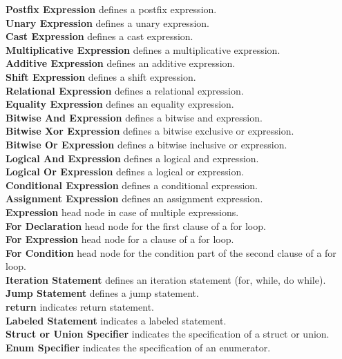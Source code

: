 \documentclass[12pt]{article}
\begin{document}
\begin{multicols}{2}
	\textbf{Postfix Expression} defines a postfix expression.\\
	\textbf{Unary Expression} defines a unary expression.\\
	\textbf{Cast Expression} defines a cast expression.\\
	\textbf{Multiplicative Expression} defines a multiplicative expression.\\
	\textbf{Additive Expression} defines an additive expression.\\
	\textbf{Shift Expression} defines a shift expression.\\
	\textbf{Relational Expression} defines a relational expression.\\
	\textbf{Equality Expression} defines an equality expression.\\
	\textbf{Bitwise And Expression} defines a bitwise and expression.\\
	\textbf{Bitwise Xor Expression} defines a bitwise exclusive or expression.\\
	\textbf{Bitwise Or Expression} defines a bitwise inclusive or expression.\\
	\textbf{Logical And Expression} defines a logical and expression.\\
	\textbf{Logical Or Expression} defines a logical or expression.\\
	\textbf{Conditional Expression} defines a conditional expression.\\
	\textbf{Assignment Expression} defines an assignment expression.\\
	\textbf{Expression} head node in case of multiple expressions.\\
	\textbf{For Declaration} head node for the first clause of a for loop.\\
	\textbf{For Expression} head node for a clause of a for loop.\\
	\textbf{For Condition} head node for the condition part of the second clause of a for loop.\\
	\textbf{Iteration Statement} defines an iteration statement (for, while, do while).\\
	\textbf{Jump Statement} defines a jump statement.\\
	\textbf{return} indicates return statement.\\
	\textbf{Labeled Statement} indicates a labeled statement.\\
	\textbf{Struct or Union Specifier} indicates the specification of a struct or union.\\
	\textbf{Enum Specifier} indicates the specification of an enumerator.\\

\end{multicols}
\end{document}
